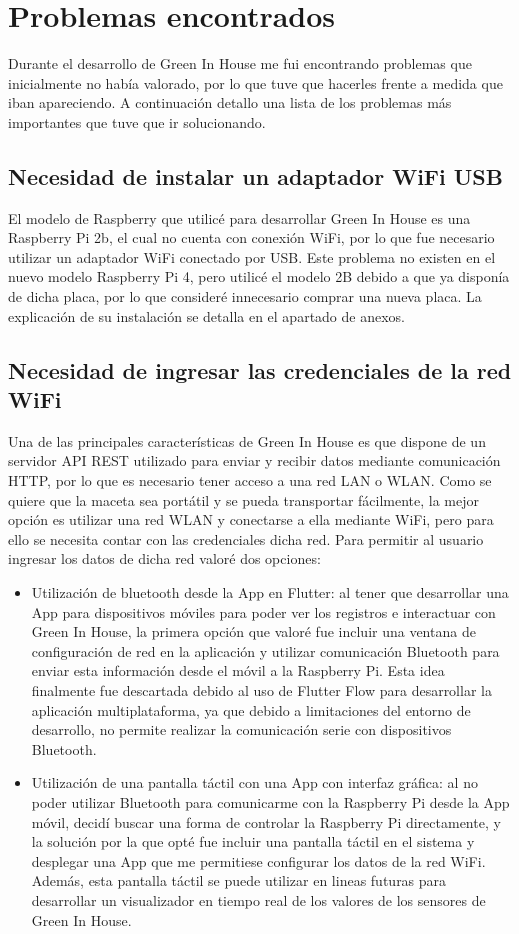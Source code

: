 \section{Problemas encontrados}
Durante el desarrollo de Green In House me fui encontrando problemas que inicialmente no había valorado, por lo que tuve que hacerles frente a medida que iban apareciendo. A continuación detallo una lista de los problemas más importantes que tuve que ir solucionando.

    \subsection{Necesidad de instalar un adaptador WiFi USB}  
    El modelo de Raspberry que utilicé para desarrollar Green In House es una Raspberry Pi 2b, el cual no cuenta con conexión WiFi, por lo que fue necesario utilizar un adaptador WiFi conectado por USB. Este problema no existen en el nuevo modelo Raspberry Pi 4, pero utilicé el modelo 2B debido a que ya disponía de dicha placa, por lo que consideré innecesario comprar una nueva placa. La explicación de su instalación se detalla en el apartado de anexos.
    
    \subsection{Necesidad de ingresar las credenciales de la red WiFi}
    Una de las principales características de Green In House es que dispone de un servidor API REST utilizado para enviar y recibir datos mediante comunicación HTTP, por lo que es necesario tener acceso a una red LAN o WLAN. Como se quiere que la maceta sea portátil y se pueda transportar fácilmente, la mejor opción es utilizar una red WLAN y conectarse a ella mediante WiFi, pero para ello se necesita contar con las credenciales dicha red. Para permitir al usuario ingresar los datos de dicha red valoré dos opciones:
    \begin{itemize}
        \item Utilización de bluetooth desde la App en Flutter: al tener que desarrollar una App para dispositivos móviles para poder ver los registros e interactuar con Green In House, la primera opción que valoré fue incluir una ventana de configuración de red en la aplicación y utilizar comunicación Bluetooth para enviar esta información desde el móvil a la Raspberry Pi. Esta idea finalmente fue descartada debido al uso de Flutter Flow para desarrollar la aplicación multiplataforma, ya que debido a limitaciones del entorno de desarrollo, no permite realizar la comunicación serie con dispositivos Bluetooth.
        \item Utilización de una pantalla táctil con una App con interfaz gráfica: al no poder utilizar Bluetooth para comunicarme con la Raspberry Pi desde la App móvil, decidí buscar una forma de controlar la Raspberry Pi directamente, y la solución por la que opté fue incluir una pantalla táctil en el sistema y desplegar una App que me permitiese configurar los datos de la red WiFi. Además, esta pantalla táctil se puede utilizar en lineas futuras para desarrollar un visualizador en tiempo real de los valores de los sensores de Green In House.
    \end{itemize}
    

